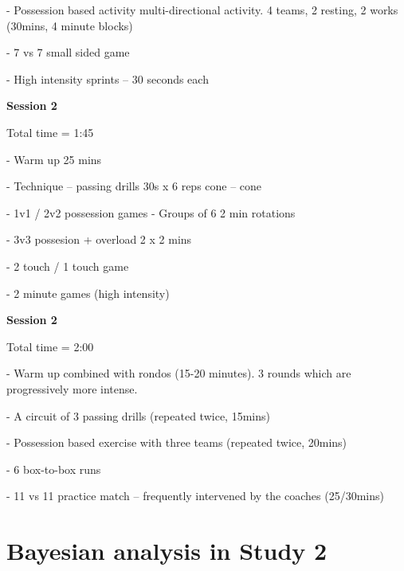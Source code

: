 \documentclass[man,floatsintext]{apa6}
\begin{document}
\begin{flushleft}
- Possession based activity multi-directional activity. 4 teams, 2 resting, 2 works (30mins, 4 minute blocks)

- 7 vs 7 small sided game

- High intensity sprints – 30 seconds each

\textbf{Session 2}

Total time = 1:45

- Warm up 25 mins

- Technique – passing drills 30s x 6 reps cone – cone

- 1v1 / 2v2 possession games - Groups of 6 2 min rotations

- 3v3 possesion + overload 2 x 2 mins

- 2 touch / 1 touch game

- 2 minute games (high intensity)


\textbf{Session 2}

Total time = 2:00

- Warm up combined with rondos (15-20 minutes). 3 rounds which are progressively more intense.

- A circuit of 3 passing drills (repeated twice, 15mins)

- Possession based exercise with three teams (repeated twice, 20mins)

- 6 box-to-box runs

- 11 vs 11 practice match – frequently intervened by the coaches (25/30mins)

\end{flushleft}

\section{Bayesian analysis in Study 2}

\end{document}
